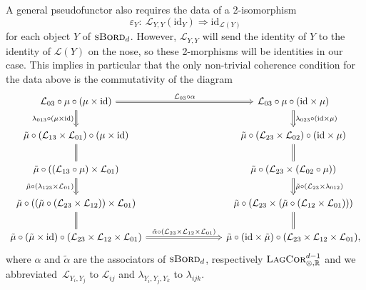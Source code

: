 \documentclass[10pt,a4paper]{amsart}
\numberwithin{equation}{section}
\newcommand{\LagCor}{\textsc{LagCor}}
\newcommand{\R}{\mathbb{R}}
\newcommand{\id}{\mathrm{id}}
\newcommand{\sBord}{\textsc{sBord}}
\begin{document}
A general pseudofunctor also requires the data of a 2-isomorphism
\begin{equation*}
\varepsilon_Y\colon\ \mathcal{L}_{Y, Y}(\id_Y) \Longrightarrow \id_{\mathcal{L}(Y)}
\end{equation*}
for each object $Y$ of $\sBord_d$.
However, $\mathcal{L}_{Y, Y}$ will send the identity of $Y$ to the identity of $\mathcal{L}(Y)$ on the nose, so these 2-morphisms will be identities in our case.
This implies in particular that the only non-trivial coherence condition for the data above is the commutativity of the diagram%
\begin{equation*}
\begin{tikzcd}[column sep=2.8cm]
\mathcal{L}_{03} \circ \mu \circ (\mu \times \id) \ar[r, "\mathcal{L}_{03} \circ \alpha", Rightarrow]
\ar[d, Rightarrow, "\lambda_{013} \circ (\mu \times \id)"']
	&
	\mathcal{L}_{03} \circ \mu \circ (\id \times \mu)
	\ar[d, Rightarrow, "\lambda_{023} \circ (\id \times \mu)"]
	\\
\tilde{\mu} \circ (\mathcal{L}_{13} \times \mathcal{L}_{01}) \circ (\mu \times \id)
	\ar[d, equal]
	&
	\tilde{\mu} \circ (\mathcal{L}_{23} \times \mathcal{L}_{02}) \circ ( \id \times \mu )
	\ar[d, equal]
\\
\tilde{\mu} \circ ((\mathcal{L}_{13} \circ \mu)\times \mathcal{L}_{01})
	\ar[d, Rightarrow, "\tilde{\mu} \circ (\lambda_{123} \times \mathcal{L}_{01})"']
	&
	\tilde{\mu} \circ (\mathcal{L}_{23} \times (\mathcal{L}_{02} \circ \mu ))
	\ar[d, Rightarrow, "\tilde{\mu} \circ (\mathcal{L}_{23} \times \lambda_{012})"]
\\
 \tilde{\mu} \circ ((\tilde{\mu} \circ (\mathcal{L}_{23} \times \mathcal{L}_{12})) \times \mathcal{L}_{01})
 		\ar[d, equal]
 		&
		\tilde{\mu} \circ (\mathcal{L}_{23} \times (\tilde{\mu} \circ ( \mathcal{L}_{12} \times \mathcal{L}_{01})))
		\ar[d, equal]
		\\
 \tilde{\mu} \circ (\tilde{\mu} \times \id) \circ (\mathcal{L}_{23} \times \mathcal{L}_{12} \times \mathcal{L}_{01})
 	\ar[r, Rightarrow, "\tilde{\alpha} \circ (\mathcal{L}_{23} \times \mathcal{L}_{12} \times \mathcal{L}_{01})"]
 		&
		\tilde{\mu} \circ (\id \times \tilde{\mu}) \circ (\mathcal{L}_{23} \times \mathcal{L}_{12} \times \mathcal{L}_{01}),
\end{tikzcd}
\end{equation*}
where $\alpha$ and $\tilde{\alpha}$ are the associators of $\sBord_d$, respectively $\LagCor_{\otimes, \R}^{d-1}$ and we abbreviated~$\mathcal{L}_{Y_i, Y_j}$ to $\mathcal{L}_{ij}$ and $\lambda_{Y_i, Y_j, Y_k}$ to $\lambda_{ijk}$.
\end{document}
